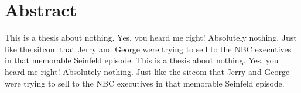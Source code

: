 \chapter*{Abstract}

This is a thesis about nothing. Yes, you heard me right! Absolutely nothing. Just like the sitcom that Jerry and George were trying to sell to the NBC executives in that memorable Seinfeld episode.
This is a thesis about nothing. Yes, you heard me right! Absolutely nothing. Just like the sitcom that Jerry and George were trying to sell to the NBC executives in that memorable Seinfeld episode.